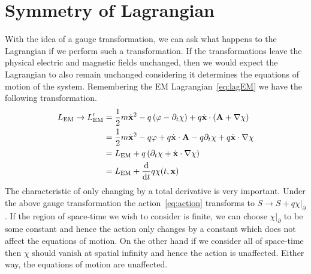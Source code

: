 \section{Symmetry of Lagrangian}
With the idea of a gauge transformation, we can ask what happens to the
Lagrangian if we perform such a transformation. If the transformations leave the
physical electric and magnetic fields unchanged, then we would expect the
Lagrangian to also remain unchanged considering it determines the equations of
motion of the system. Remembering the EM Lagrangian~\ref{eq:lagEM} we have the
following transformation.
\begin{align*}
    L_\text{EM}\to L_\text{EM}' & = \frac{1}{2}m\dot{\mathbf{x}}^2 - q\left(\varphi - \partial_t\chi\right) + q\dot{\mathbf{x}}\cdot\left(\mathbf{A} + \nabla\chi\right) \\
                                & = \frac{1}{2}m\dot{\mathbf{x}}^2 - q\varphi + q\dot{\mathbf{x}}\cdot\mathbf{A} - q\partial_t\chi + q\dot{\mathbf{x}}\cdot\nabla\chi \\
                                & = L_\text{EM} + q\left(\partial_t\chi + \dot{\mathbf{x}}\cdot\nabla\chi\right) \\
                                & = L_\text{EM} + \dv{t}q\chi(t,\mathbf{x})
\end{align*}
The characteristic of only changing by a total derivative is very important.
Under the above gauge transformation the action~\ref{eq:action} transforms to
\(S\to S + q\chi|_\partial\). If the region of space-time we wish to consider is
finite, we can choose \(\chi|_\partial\) to be some constant and hence the action
only changes by a constant which does not affect the equations of motion. On the
other hand if we consider all of space-time then \(\chi\) should vanish at
spatial infinity and hence the action is unaffected. Either way, the equations
of motion are unaffected.

